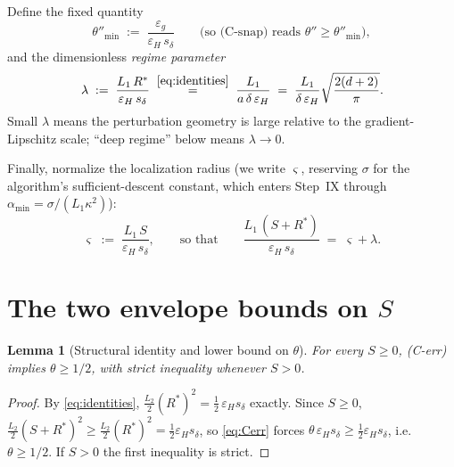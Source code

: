 \documentclass[11pt,a4paper]{article}
\theoremstyle{plain}
\newtheorem{lemma}{Lemma}
\theoremstyle{definition}
\newcommand{\eps}{\varepsilon}
\newcommand{\epsg}{\eps_{g}}
\newcommand{\epsH}{\eps_{H}}
\newcommand{\sdel}{s_{\delta}}
\newcommand{\Rstar}{R^{*}}
\newcommand{\thetamin}{\theta''_{\min}}
\newcommand{\amin}{\alpha_{\min}}
\begin{document}

Define the fixed quantity
\begin{equation}\label{eq:thetamin}
\thetamin \;:=\; \frac{\epsg}{\epsH\,\sdel}
\qquad\text{(so (C-snap) reads } \theta'' \ge \thetamin\text{)},
\end{equation}
and the dimensionless \emph{regime parameter}
\begin{equation}\label{eq:lambda}
\lambda \;:=\; \frac{L_1\,\Rstar}{\epsH\,\sdel}
\;\overset{\eqref{eq:identities}}{=}\; \frac{L_1}{a\,\delta\,\epsH}
\;=\; \frac{L_1}{\delta\,\epsH}\sqrt{\frac{2(d+2)}{\pi}} .
\end{equation}
Small $\lambda$ means the perturbation geometry is large relative to the
gradient-Lipschitz scale; ``deep regime'' below means $\lambda \to 0$.

Finally, normalize the localization radius (we write $\varsigma$, reserving
$\sigma$ for the algorithm's sufficient-descent constant, which enters Step~IX
through $\amin = \sigma/(L_1\kappa^2)$):
\begin{equation}\label{eq:sigma}
\varsigma \;:=\; \frac{L_1\,S}{\epsH\,\sdel}, \qquad\text{so that}\qquad
\frac{L_1\,(S+\Rstar)}{\epsH\,\sdel} \;=\; \varsigma + \lambda .
\end{equation}

\section{The two envelope bounds on $S$}\label{sec:envelopes}

\begin{lemma}[Structural identity and lower bound on $\theta$]
\label{lem:structural}
For every $S \ge 0$, \emph{(C-err)} implies $\theta \ge 1/2$, with strict
inequality whenever $S>0$.
\end{lemma}

\begin{proof}
By \eqref{eq:identities}, $\tfrac{L_2}{2}(\Rstar)^2 =
\tfrac12\,\epsH\sdel$ exactly. Since $S\ge 0$,
$\tfrac{L_2}{2}(S+\Rstar)^2 \ge \tfrac{L_2}{2}(\Rstar)^2 =
\tfrac12\epsH\sdel$, so \eqref{eq:Cerr} forces
$\theta\,\epsH\sdel \ge \tfrac12\epsH\sdel$, i.e.\ $\theta\ge 1/2$.
If $S>0$ the first inequality is strict.
\end{proof}
\end{document}
